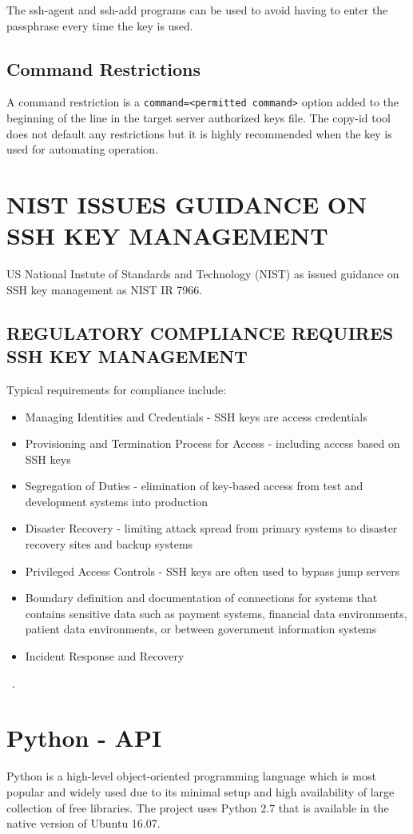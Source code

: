 The ssh-agent and ssh-add programs can be used to avoid having to 
enter the passphrase every time the key is used.

\subsection{Command Restrictions}
A command restriction is a \verb|command=<permitted command>| option
added to the beginning of the line in the target server authorized
keys file.  The copy-id tool does not default any restrictions but it
is highly recommended when the key is used for automating operation.

\section{NIST ISSUES GUIDANCE ON SSH KEY MANAGEMENT}
US National Instute of Standards and Technology (NIST) as issued guidance on
SSH key management as NIST IR 7966. 

\subsection{REGULATORY COMPLIANCE REQUIRES SSH KEY MANAGEMENT}
Typical requirements for compliance include:
\begin{itemize}
	\item Managing Identities and Credentials - SSH keys 
	are access credentials
	\item Provisioning and Termination Process for Access 
    - including access based on SSH keys
	\item Segregation of Duties - elimination of 
	key-based access from test and development systems into
	production
    \item Disaster Recovery - limiting attack spread
    from primary systems to disaster recovery sites and
    backup systems
    \item Privileged Access Controls - SSH keys are often used to 
    bypass jump servers
    \item Boundary definition and documentation of connections for 
    systems that contains sensitive data such as payment systems,
    financial data environments, patient data 
    environments, or between government information systems
    \item Incident Response and Recovery
\end{itemize}
~\cite{hid-sp18-513-sshkey}.

\section{Python - API}
Python is a high-level object-oriented programming language which 
is most popular and widely used due to its minimal setup and high
availability of large collection of free libraries. The project 
uses Python 2.7 that is available in the native version of 
Ubuntu 16.07.


